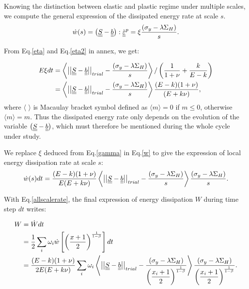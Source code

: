 Knowing the distinction between elastic and plastic regime under multiple scales, we compute the general expression of the dissipated energy rate at scale $s$.
\begin{equation}
\dot{w}(s)=\left( \uline{\uline{S}}-\uline{\uline{b}}\right) :\dot{\uline{\uline{\varepsilon}}}^p=\xi\dfrac{  \left(\sigma_y-\lambda \Sigma_H\right)}{s}.
\label{w}
\end{equation}

From Eq.\eqref{eta} and Eq.\eqref{eta2} in annex, we get:

\begin{equation}
	\begin{split}
		E\xi dt&=\left\langle \left| \left|\uline{\uline{S}}-\uline{\uline{b}}\right| \right|_{trial}-\dfrac{ \left(\sigma_y-\lambda \Sigma_H\right)}{s}\right\rangle /\left(\dfrac{1}{1+\nu}+\dfrac{k}{E-k} \right)
		\\&=\left\langle \left| \left|\uline{\uline{S}}-\uline{\uline{b}}\right| \right|_{trial}-\dfrac{ \left(\sigma_y-\lambda \Sigma_H\right)}{s}\right\rangle\dfrac{(E-k)(1+\nu) }{(E+k\nu)},
	\end{split}
	\label{gamma}
\end{equation}
where $\langle$ $\rangle$ is Macaulay bracket symbol defined as $\langle m\rangle=0$ if $m\leqslant0$, otherwise $\langle m\rangle=m$. Thus the dissipated energy rate only depends on the evolution of the variable $\left( \uline{\uline{S}}-\uline{\uline{b}}\right)$, which must therefore be mentioned during the whole cycle under study.

We replace $\xi$ deduced from Eq.\eqref{gamma} in Eq.\eqref{w} to give the expression of local energy dissipation rate at scale $s$:
\begin{equation}
\dot{w}(s)dt=\dfrac{(E-k)(1+\nu) }{E(E+k\nu)}\left\langle  \left| \left|\uline{\uline{S}}-\uline{\uline{b}}\right| \right|_{trial}-\dfrac{ \left(\sigma_y-\lambda \Sigma_H\right)}{s}\right\rangle \dfrac{ \left(\sigma_y-\lambda \Sigma_H\right)}{s}.
\label{dW}
\end{equation}

With Eq.\eqref{allscalerate}, the final expression of energy dissipation $W$ during time step $dt$ writes:

\begin{equation}
\begin{split}
W&=\dot{W}dt
\\&=\frac{1}{2}\sum_{i}\omega_i\dot{w}\left[  \left( \frac{x+1}{2}\right) ^{\frac{1}{1-\beta}}\right]dt
\\&=\dfrac{(E-k)(1+\nu) }{2E(E+k\nu)}\sum_{i}\omega_i\left\langle  \left| \left|\uline{\uline{S}}-\uline{\uline{b}}\right| \right|_{trial}-\dfrac{\left(\sigma_y-\lambda \Sigma_H\right) }{\left( \dfrac{x_i+1}{2}\right) ^{\frac{1}{1-\beta}}}\right\rangle \dfrac{\left(\sigma_y-\lambda \Sigma_H\right) }{\left( \dfrac{x_i+1}{2}\right)^{\frac{1}{1-\beta}}}.
\end{split}
\label{finaldw}
\end{equation}

